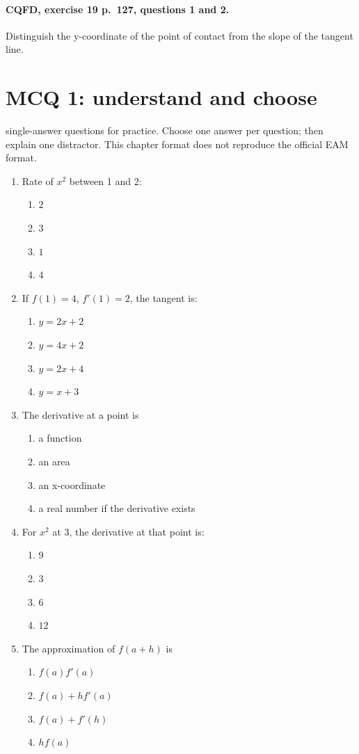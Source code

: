 \paragraph{CQFD, exercise 19 p.~127, questions 1 and 2.}\label{C04-M2} Distinguish the y-coordinate of the point of contact from the slope of the tangent line.
\begingroup\small
\mxnewpage\section*{MCQ 1: understand and choose}\label{C04-Q1}
 single-answer questions for practice. Choose one answer per question; then explain one distractor. This chapter format does not reproduce the official EAM format.
\begin{enumerate}
\item Rate of $x^2$ between 1 and 2:
\begin{enumerate}[label=\Alph*.,itemsep=2pt]
\item $2$
\item $3$
\item $1$
\item $4$
\end{enumerate}
\item If $f(1)=4$, $f\prime(1)=2$, the tangent is:
\begin{enumerate}[label=\Alph*.,itemsep=2pt]
\item $y=2x+2$
\item $y=4x+2$
\item $y=2x+4$
\item $y=x+3$
\end{enumerate}
\item The derivative at a point is
\begin{enumerate}[label=\Alph*.,itemsep=2pt]
\item a function
\item an area
\item an x-coordinate
\item a real number if the derivative exists
\end{enumerate}
\item For $x^2$ at 3, the derivative at that point is:
\begin{enumerate}[label=\Alph*.,itemsep=2pt]
\item $9$
\item $3$
\item $6$
\item $12$
\end{enumerate}
\item The approximation of $f(a+h)$ is
\begin{enumerate}[label=\Alph*.,itemsep=2pt]
\item $f(a)f\prime(a)$
\item $f(a)+hf\prime(a)$
\item $f(a)+f\prime(h)$
\item $hf(a)$
\end{enumerate}
\end{enumerate}
